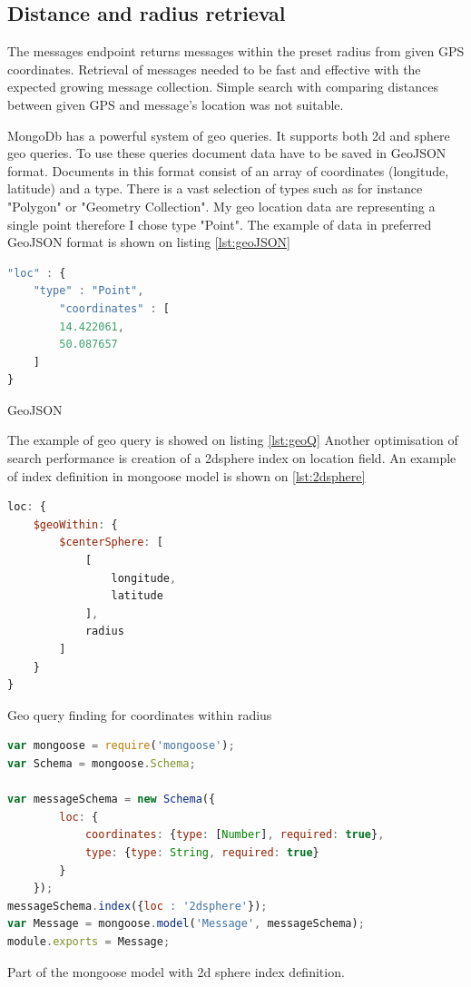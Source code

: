 \documentclass[thesis=M,english]{FITthesis}[2012/10/20]
\begin{document}
\newpage
\subsection{Distance and radius retrieval}

The messages endpoint returns messages within the preset radius from given GPS coordinates. Retrieval of messages needed to be fast and effective with the expected growing message collection. Simple search with comparing distances between given GPS and message's location was not suitable. 

MongoDb has a powerful system of geo queries. It supports both 2d and sphere geo queries. To use these queries document data have to be saved in GeoJSON format. Documents in this format consist of an array of coordinates (longitude, latitude) and a type. There is a vast selection of types such as for instance "Polygon" or "Geometry Collection". My geo location data are representing a single point therefore I chose type "Point". The example of data in preferred GeoJSON format is shown on listing \ref{lst:geoJSON}

\begin{listing}
\begin{lstlisting}[language=JavaScript]
"loc" : {
    "type" : "Point",
        "coordinates" : [
        14.422061,
        50.087657
    ]
}
\end{lstlisting}
\caption{GeoJSON}
\label{lst:geoJSON}
\end{listing}

The example of geo query is showed on listing \ref{lst:geoQ} Another optimisation of search performance is creation of a 2dsphere index on location field. An example of index definition in mongoose model is shown on \ref{lst:2dsphere}


\begin{listing}
\begin{lstlisting}[language=JavaScript]
loc: {
    $geoWithin: {
        $centerSphere: [
            [
                longitude,
                latitude
            ],
            radius
        ]
    }
}
\end{lstlisting}
\caption{Geo query finding for coordinates within radius}
\label{lst:geoQ}
\end{listing}


\begin{listing}
\begin{lstlisting}[language=JavaScript]
var mongoose = require('mongoose');
var Schema = mongoose.Schema;

var messageSchema = new Schema({
        loc: {
            coordinates: {type: [Number], required: true},
            type: {type: String, required: true}
        }
    });
messageSchema.index({loc : '2dsphere'});
var Message = mongoose.model('Message', messageSchema);
module.exports = Message;
\end{lstlisting}
\caption{Part of the mongoose model with 2d sphere index definition.}
\label{lst:2dsphere}
\end{listing}
\end{document}
